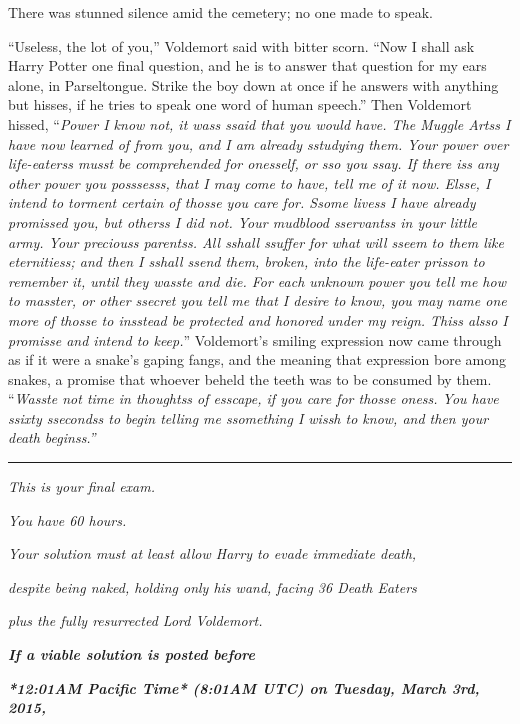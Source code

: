 There was stunned silence amid the cemetery; no one made to speak.

``Useless, the lot of you,'' Voldemort said with bitter scorn. ``Now I shall ask Harry Potter one final question, and he is to answer that question for my ears alone, in Parseltongue. Strike the boy down at once if he answers with anything but hisses, if he tries to speak one word of human speech.'' Then Voldemort hissed, ``\emph{Power I know not, it wass ssaid that you would have. The Muggle Artss I have now learned of from you, and I am already sstudying them. Your power over life-eaterss musst be comprehended for onesself, or sso you ssay. If there iss any other power you posssesss, that I may come to have, tell me of it now. Elsse, I intend to torment certain of thosse you care for. Ssome livess I have already promissed you, but otherss I did not. Your mudblood sservantss in your little army. Your preciouss parentss. All sshall ssuffer for what will sseem to them like eternitiess; and then I sshall ssend them, broken, into the life-eater prisson to remember it, until they wasste and die. For each unknown power you tell me how to masster, or other ssecret you tell me that I desire to know, you may name one more of thosse to insstead be protected and honored under my reign. Thiss alsso I promisse and intend to keep.}'' Voldemort's smiling expression now came through as if it were a snake's gaping fangs, and the meaning that expression bore among snakes, a promise that whoever beheld the teeth was to be consumed by them. ``\emph{Wasste not time in thoughtss of esscape, if you care for thosse oness. You have ssixty ssecondss to begin telling me ssomething I wissh to know, and then your death beginss.''}

\begin{center}\rule{3in}{0.4pt}\end{center}

\emph{This is your final exam.}

\emph{You have 60 hours.}

\emph{Your solution must at least allow Harry to evade immediate death,}

\emph{despite being naked, holding only his wand, facing 36 Death Eaters}

\emph{plus the fully resurrected Lord Voldemort.}

\emph{\textbf{If a viable solution is posted before}}

\emph{\textbf{*12:01AM Pacific Time* (8:01AM UTC) on Tuesday, March 3rd, 2015,}}

